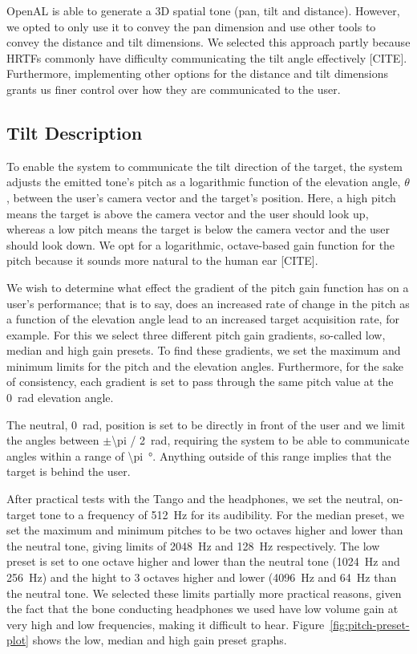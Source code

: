 \documentclass[format=sigconf, review=true, screen=true, anonymous=true]{acmart}
\begin{document}
OpenAL is able to generate a 3D spatial tone (pan, tilt and distance). However, we opted to only use it to convey the pan dimension and use other tools to convey the distance and tilt dimensions. We selected this approach partly because HRTFs commonly have difficulty communicating the tilt angle effectively [CITE]. Furthermore, implementing other options for the distance and tilt dimensions grants us finer control over how they are communicated to the user.

\subsection{Tilt Description}

To enable the system to communicate the tilt direction of the target, the system adjusts the emitted tone's pitch as a logarithmic function of the elevation angle, $\theta$, between the user's camera vector and the target's position. Here, a high pitch means the target is above the camera vector and the user should look up, whereas a low pitch means the target is below the camera vector and the user should look down. We opt for a logarithmic, octave-based gain function for the pitch because it sounds more natural to the human ear [CITE].

We wish to determine what effect the gradient of the pitch gain function has on a user's performance; that is to say, does an increased rate of change in the pitch as a function of the elevation angle lead to an increased target acquisition rate, for example. For this we select three different pitch gain gradients, so-called low, median and high gain presets. To find these gradients, we set the maximum and minimum limits for the pitch and the elevation angles. Furthermore, for the sake of consistency, each gradient is set to pass through the same pitch value at the \SI{0}{\radian} elevation angle.   

The neutral, \SI{0}{\radian}, position is set to be directly in front of the user and we limit the angles between $\pm$\SI[quotient-mode=fraction]{\pi / 2}{\radian}, requiring the system to be able to communicate angles within a range of \SI{\pi}{\degree}. Anything outside of this range implies that the target is behind the user. 

After practical tests with the Tango and the headphones, we set the neutral, on-target tone to a frequency of \SI{512}{\hertz} for its audibility. For the median preset, we set the maximum and minimum pitches to be two octaves higher and lower than the neutral tone, giving limits of \SI{2048}{\hertz} and \SI{128}{\hertz} respectively. The low preset is set to one octave higher and lower than the neutral tone (\SI{1024}{\hertz} and \SI{256}{\hertz}) and the hight to 3 octaves higher and lower (\SI{4096}{\hertz} and \SI{64}{\hertz} than the neutral tone. We selected these limits partially more practical reasons, given the fact that the bone conducting headphones we used have low volume gain at very high and low frequencies, making it difficult to hear. Figure~\ref{fig:pitch-preset-plot} shows the low, median and high gain preset graphs.  
\end{document}
